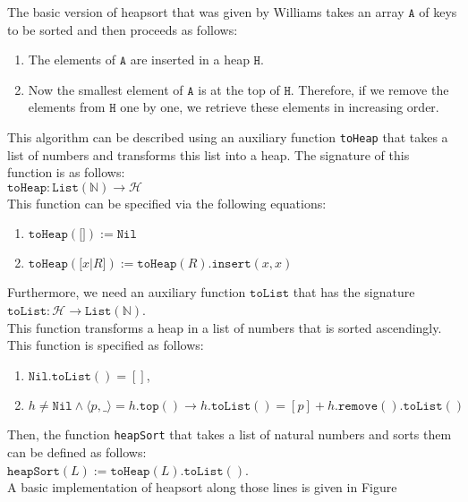 The basic version of heapsort that was given by Williams takes an array $\texttt{A}$ of keys to be sorted and
then proceeds as follows:
\begin{enumerate}
\item The elements of $\texttt{A}$ are inserted in a heap $\texttt{H}$.
\item Now the smallest element of $\texttt{A}$ is at the top of $\texttt{H}$.  Therefore, if we remove the elements
      from $\texttt{H}$ one by one, we retrieve these elements in increasing order.
\end{enumerate}
This algorithm can be described using an auxiliary function \texttt{toHeap} that takes a list of numbers and
transforms this list into a heap.  The signature of this function is as follows:
\\[0.2cm]
\hspace*{1.3cm}
$\texttt{toHeap}: \texttt{List}(\mathbb{N}) \rightarrow \mathcal{H}$
\\[0.2cm]
This function can be specified via the following equations:
\begin{enumerate}
\item $\texttt{toHeap}(\texttt{[]}) := \texttt{Nil}$
\item $\texttt{toHeap}(\texttt{[}x\texttt{|}R\texttt{]}) := \texttt{toHeap}(R).\texttt{insert}(x, x)$
\end{enumerate}
Furthermore, we need an auxiliary function $\texttt{toList}$ that has the signature
\\[0.2cm]
\hspace*{1.3cm}
$\texttt{toList}: \mathcal{H} \rightarrow \texttt{List}(\mathbb{N})$.
\\[0.2cm]
This function transforms a heap in a list of numbers that is sorted ascendingly.  This function is specified as
follows:
\begin{enumerate}
\item $\texttt{Nil}.\texttt{toList}() = []$,
\item $h \not= \texttt{Nil} \wedge \langle p, \_ \rangle = h.\texttt{top}() \rightarrow h.\texttt{toList}() = [p] + h.\texttt{remove}().\texttt{toList}()$
\end{enumerate}
Then, the function \texttt{heapSort} that takes a list of natural numbers and sorts them can be defined as follows:
\\[0.2cm]
\hspace*{1.3cm}
$\texttt{heapSort}(L) := \texttt{toHeap}(L).\texttt{toList}()$.
\\[0.2cm]
A basic implementation of heapsort along those lines is given in Figure
